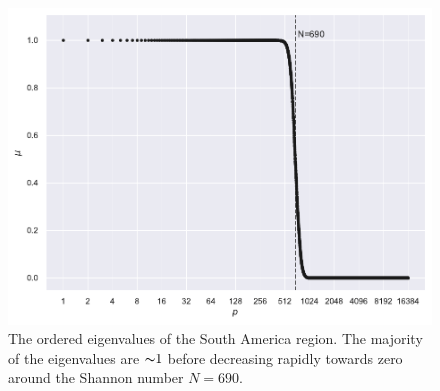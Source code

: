 \begin{figure}[htpb]
	\centering\capstart{}
	\includegraphics[width=\textwidth]{south_america_eigenvalues_L128.pdf}
	\caption[
		The Slepian eigenvalues of the South America region
	]{
		The ordered eigenvalues of the South America region.
		The majority of the eigenvalues are \({\thicksim}1\) before decreasing rapidly towards zero around the Shannon number \(N=690\).
	}\label{fig:chapter4_eigenvalues}
\end{figure}
